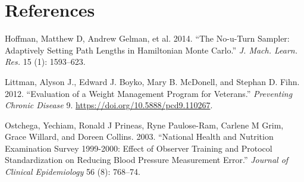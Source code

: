 \documentclass[
]{article}
\newlength{\cslhangindent}
\newenvironment{CSLReferences}[2] %
 {\begin{list}{}{%
  \setlength{\itemindent}{0pt}
  \setlength{\leftmargin}{0pt}
  \setlength{\parsep}{0pt}
  \ifodd #1
   \setlength{\leftmargin}{\cslhangindent}
   \setlength{\itemindent}{-1\cslhangindent}
  \fi
  \setlength{\itemsep}{#2\baselineskip}}}
 {\end{list}}
\begin{document}
\section*{References}\label{references}

\label{refs}
\begin{CSLReferences}{1}{0}
Hoffman, Matthew D, Andrew Gelman, et al. 2014. {``The No-u-Turn Sampler: Adaptively Setting Path Lengths in Hamiltonian Monte Carlo.''} \emph{J. Mach. Learn. Res.} 15 (1): 1593--623.

Littman, Alyson J., Edward J. Boyko, Mary B. McDonell, and Stephan D. Fihn. 2012. {``Evaluation of a Weight Management Program for Veterans.''} \emph{Preventing Chronic Disease} 9. \url{https://doi.org/10.5888/pcd9.110267}.

Ostchega, Yechiam, Ronald J Prineas, Ryne Paulose-Ram, Carlene M Grim, Grace Willard, and Doreen Collins. 2003. {``National Health and Nutrition Examination Survey 1999-2000: Effect of Observer Training and Protocol Standardization on Reducing Blood Pressure Measurement Error.''} \emph{Journal of Clinical Epidemiology} 56 (8): 768--74.

\end{CSLReferences}
\end{document}
